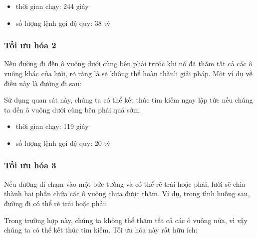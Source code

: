 \begin{itemize}
\item
thời gian chạy: 244 giây
\item
số lượng lệnh gọi đệ quy: 38 tỷ
\end{itemize}

\subsubsection{Tối ưu hóa 2}

Nếu đường đi đến ô vuông dưới cùng bên phải
trước khi nó đã thăm tất cả các ô vuông khác của lưới,
rõ ràng là
sẽ không thể hoàn thành giải pháp.
Một ví dụ về điều này là đường đi sau:

\begin{center}
\end{center}
Sử dụng quan sát này, chúng ta có thể kết thúc tìm kiếm
ngay lập tức nếu chúng ta đến ô vuông dưới cùng bên phải quá sớm.
\begin{itemize}
\item
thời gian chạy: 119 giây
\item
số lượng lệnh gọi đệ quy: 20 tỷ
\end{itemize}

\subsubsection{Tối ưu hóa 3}

Nếu đường đi chạm vào một bức tường
và có thể rẽ trái hoặc phải,
lưới sẽ chia thành hai phần
chứa các ô vuông chưa được thăm.
Ví dụ, trong tình huống sau,
đường đi có thể rẽ trái hoặc phải:

\begin{center}
\end{center}
Trong trường hợp này, chúng ta không thể thăm tất cả các ô vuông nữa,
vì vậy chúng ta có thể kết thúc tìm kiếm.
Tối ưu hóa này rất hữu ích:

